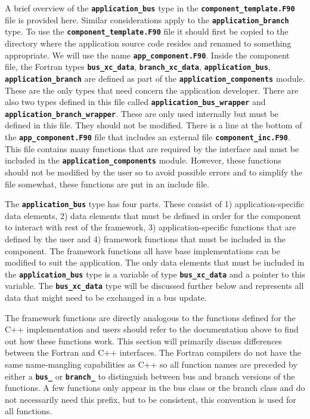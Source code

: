 A brief overview of the \texttt{\textbf{application\_bus}} type in the \texttt{\textbf{component\_template.F90}} file is provided here. Similar considerations apply to the \texttt{\textbf{application\_branch}} type. To use the \texttt{\textbf{component\_template.F90}} file it should first be copied to the directory where the application source code resides and renamed to something appropriate. We will use the name \texttt{\textbf{app\_component.F90}}. Inside the component file, the Fortran types \texttt{\textbf{bus\_xc\_data}}, \texttt{\textbf{branch\_xc\_data}}, \texttt{\textbf{application\_bus}}, \texttt{\textbf{application\_branch}} are defined as part of the \texttt{\textbf{application\_components}} module. These are the only types that need concern the application developer. There are also two types defined in this file called \texttt{\textbf{application\_bus\_wrapper}} and \texttt{\textbf{application\_branch\_wrapper}}. These are only used internally but must be defined in this file. They should not be modified. There is a line at the bottom of the \texttt{\textbf{app\_component.F90}} file that includes an external file \texttt{\textbf{component\_inc.F90}}. This file contains many functions that are required by the interface and must be included in the \texttt{\textbf{application\_components}} module. However, these functions should not be modified by the user so to avoid possible errors and to simplify the file somewhat, these functions are put in an include file.

The \texttt{\textbf{application\_bus}} type has four parts. These consist of 1) application-specific data elements, 2) data elements that must be defined in order for the component to interact with rest of the framework, 3) application-specific functions that are defined by the user and 4) framework functions that must be included in the component. The framework functions all have base implementations can be modified to suit the application. The only data elements that must be included in the \texttt{\textbf{application\_bus}} type is a variable of type \texttt{\textbf{bus\_xc\_data}} and a pointer to this variable. The \texttt{\textbf{bus\_xc\_data}} type will be discussed further below and represents all data that might need to be exchanged in a bus update.

The framework functions are directly analogous to the functions defined for the C++ implementation and users should refer to the documentation above to find out how these functions work. This section will primarily discuss differences between the Fortran and C++ interfaces. The Fortran compilers do not have the same name-mangling capabilities as C++ so all function names are preceded by either a \texttt{\textbf{bus\_}} or \texttt{\textbf{branch\_}} to distinguish between bus and branch versions of the functions. A few functions only appear in the bus class or the branch class and do not necessarily need this prefix, but to be consistent, this convention is used for all functions.

